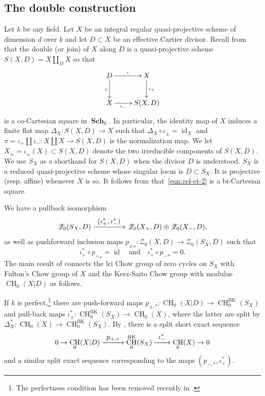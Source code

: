 \documentclass[11pt]{article}
\newcommand{\resp}{resp.\xspace}
\numberwithin{equation}{section}
\let\mathcal\mathscr
\def\To#1{\mathchoice{\xrightarrow{\textstyle\kern4pt#1\kern3pt}}{\stackrel{#1}{\longrightarrow}}{}{}}
\newcommand{\quand}{\quad\text{and}\quad}
\newcommand{\BK}{\mathrm{BK}}
\theoremstyle{definition}
\newcommand{\sZ}{{\mathcal Z}}
\DeclareMathOperator{\CH}{CH}
\DeclareMathOperator{\id}{id}
\DeclareMathOperator{\Sch}{\mathbf{Sch}}
\begin{document}
\subsection{The double construction}\label{sec:double-construction}
Let $k$ be any field.
Let $X$ be an integral regular quasi-projective scheme of dimension $d$ over $k$
and let $D \subset X$ be an effective Cartier divisor. Recall from
\cite[\S2.1]{BK} that the double (or join) of $X$ along $D$ is a quasi-projective
scheme $S(X,D) = X \amalg_D X$ so that
\begin{equation}\label{eqn:rel-et-2}
\begin{array}{c}
\xymatrix{
D \ar[r]^-{\iota} \ar[d]_{\iota} & X \ar[d]^{\iota_+} \\
X \ar[r]_-{\iota_-} & S(X,D)}
\end{array}
\end{equation}
is a co-Cartesian square in $\Sch_k$.
In particular, the identity map of $X$ induces a finite flat map
$\Delta_X\colon S(X,D) \to X$ such that $\Delta_X \circ \iota_\pm = \id_X$
and $\pi = \iota_+ \amalg \iota_-: X \amalg X \to S(X,D)$
is the normalization map.
We let $X_\pm = \iota_\pm(X) \subset S(X,D)$ denote the two irreducible
components of $S(X,D)$. We use $S_X$ as a shorthand for $S(X, D)$
when the divisor $D$ is understood. $S_X$ is a reduced quasi-projective
scheme whose singular locus is $D \subset S_X$.
It is projective (\resp affine) whenever
$X$ is so. It follows from \cite[Lem.\,2.2]{Krishna-2} that~\eqref{eqn:rel-et-2}
is a bi-Cartesian square.

We have a pullback isomorphism
\[
\sZ_0(S_X,D)\To{(\iota^*_{+}, \iota^*_{-})} \sZ_0(X_+,D) \oplus
\sZ_0(X_-,D),
\]
as well as pushforward inclusion maps
${p_{\pm}}_* \colon \sZ_0(X,D) \to \sZ_0(S_X,D)$ such that
\[
\iota^*_{+} \circ {p_{+}}_* = \id
\quand\iota^*_{+} \circ {p_{-}}_* = 0.
\]
The main result of \cite{BK} connects the lci Chow group of zero cycles on $S_X$ with Fulton's Chow group of $X$ and the Kerz-Saito Chow group with modulus $\CH_0(X|D)$ as follows.

If $k$ is perfect,\footnote{The perfectness condition has been removed
recently in \cite[Th.\,1.1]{GKR}.} there are push-forward maps
$p_{\pm,*} \colon \CH_0(X|D) \to \CH_0^{\BK}(S_X)$ and pull-back maps
$\iota^*_\pm \colon \CH_0^{\BK}(S_X) \to \CH_0(X)$, where the latter
are split by $\Delta^*_X\colon \CH_0(X) \to \CH_0^{\BK}(S_X)$.
By \cite[Th.\,7.1]{BK}, there is a split short exact
sequence
\begin{equation}\label{eqn:doubl-ex-seq}
0 \to \CH_0(X|D) \To{p_{+,*}} \CH_0^{\BK}(S_X) \To{\iota^*_-}
\CH_0(X) \to 0
\end{equation}
and a similar split exact sequence corresponding to the maps $(p_{-,*}, \iota^*_+)$.
\end{document}
